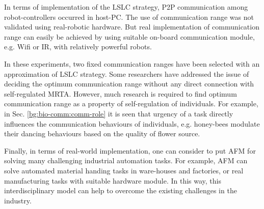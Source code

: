 In terms of implementation of the LSLC strategy, P2P communication among robot-controllers occurred in host-PC. The use of communication range was not validated using real-robotic hardware. But real implementation of communication range can easily be achieved by using suitable on-board communication module, e.g. Wifi or IR, with  relatively powerful robots.

In these experiments, two fixed communication ranges  have been selected with an approximation of LSLC strategy. Some researchers have addressed the issue of deciding the optimum communication range \cite{Yoshida+2000} without any direct connection with self-regulated MRTA. However, much research is required to find optimum communication range as a property of self-regulation of individuals. For example, in Sec. \ref{bg:bio-comm:comm-role}  it is seen that urgency of a task directly influences the communication behaviours of individuals, e.g. honey-bees modulate their dancing behaviours based on the quality of flower source.

Finally, in terms of real-world implementation, one can consider to put AFM for solving many challenging industrial automation tasks. For example, AFM can solve automated material handing tasks in ware-houses and factories, or real manufacturing tasks with suitable hardware module. In this way, this interdisciplinary model can help to overcome the existing challenges in the industry.